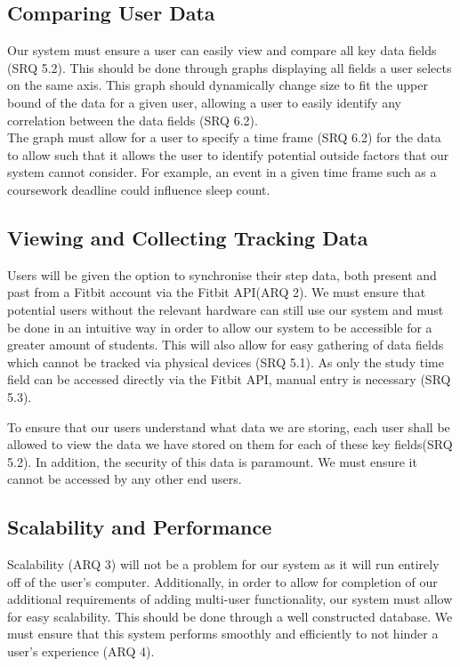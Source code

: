\documentclass[11pt]{article}
\begin{document}
\subsection{Comparing User Data}

Our system must ensure a user can easily view and compare all key data fields (SRQ 5.2). This should be 
done through graphs displaying all fields a user selects on the same axis. 
This graph should dynamically change size to fit the upper bound of the data for a given user, 
allowing a user to easily identify any correlation between the data fields (SRQ 6.2).\\

The graph must allow for a user to 
specify a time frame (SRQ 6.2) for the data to allow such that 
it allows the user to identify potential outside factors
that our system cannot consider. For example, an event in a given time frame
such as a coursework deadline could influence sleep count. 


\subsection{Viewing and Collecting Tracking Data}

Users will be given the option to synchronise their step data, both present and
past from a Fitbit account via the Fitbit API(ARQ 2). We must ensure that
potential users without the relevant hardware can still use our system and must
be done in an intuitive way in order to allow our system to be accessible for a
greater amount of students. This will also allow for easy gathering of data
fields which cannot be tracked via physical devices (SRQ 5.1). As only the
study time field can be accessed directly via the Fitbit API, manual entry is
necessary (SRQ 5.3).\par

To ensure that our users understand what data we are storing, each user shall
be allowed to view the data we have stored on them for each of these key
fields(SRQ 5.2). In addition, the security of this data is paramount. We must ensure it
cannot be accessed by any other end users.


\subsection{Scalability and Performance}

Scalability (ARQ 3) will not be a problem for our system as it will run entirely
off of the user's computer. Additionally, in order to allow for completion of our
additional requirements of adding multi-user functionality, our system must
allow for easy scalability. This should be done through a well constructed
database. We must ensure that this system performs smoothly and efficiently to not
hinder a user's experience (ARQ 4).
\end{document}
